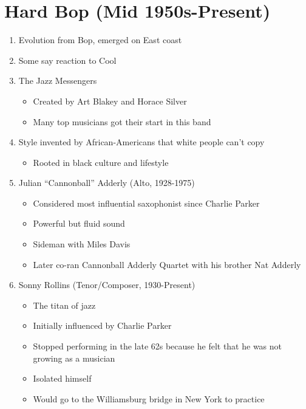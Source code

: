 \documentclass[]{article}
\providecommand{\tightlist}{%
  \setlength{\itemsep}{0pt}\setlength{\parskip}{0pt}}
\begin{document}
\section{Hard Bop (Mid 1950s-Present)}\label{hard-bop-mid-1950s-present}

\begin{enumerate}
\def\labelenumi{\arabic{enumi}.}
\tightlist
\item
  Evolution from Bop, emerged on East coast
\item
  Some say reaction to Cool
\item
  The Jazz Messengers

  \begin{itemize}
  \tightlist
  \item
    Created by Art Blakey and Horace Silver
  \item
    Many top musicians got their start in this band
  \end{itemize}
\item
  Style invented by African-Americans that white people can't copy

  \begin{itemize}
  \tightlist
  \item
    Rooted in black culture and lifestyle
  \end{itemize}
\item
  Julian ``Cannonball'' Adderly (Alto, 1928-1975)

  \begin{itemize}
  \tightlist
  \item
    Considered most influential saxophonist since Charlie Parker
  \item
    Powerful but fluid sound
  \item
    Sideman with Miles Davis
  \item
    Later co-ran Cannonball Adderly Quartet with his brother Nat Adderly
  \end{itemize}
\item
  Sonny Rollins (Tenor/Composer, 1930-Present)

  \begin{itemize}
  \tightlist
  \item
    The titan of jazz
  \item
    Initially influenced by Charlie Parker
  \item
    Stopped performing in the late 62s because he felt that he was not
    growing as a musician
  \item
    Isolated himself
  \item
    Would go to the Williamsburg bridge in New York to practice


\end{itemize}
\end{enumerate}
\end{document}
